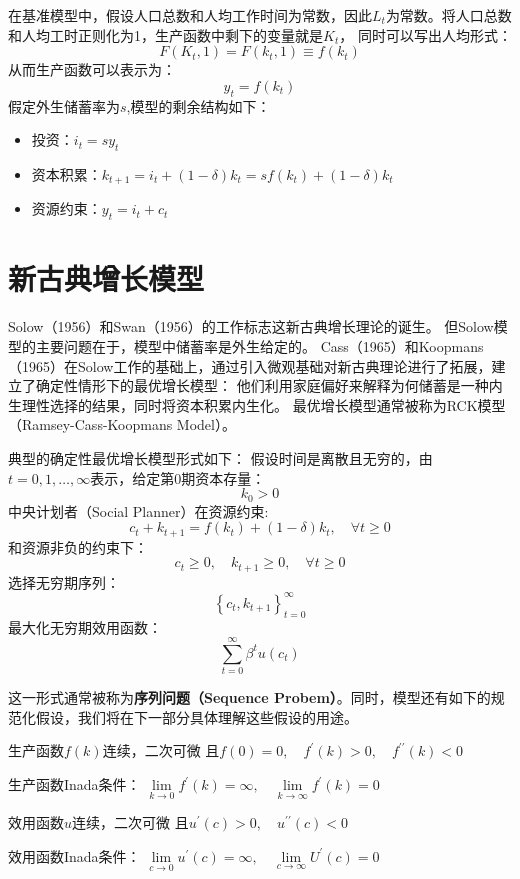 在基准模型中，假设人口总数和人均工作时间为常数，因此$L_t$为常数。将人口总数和人均工时正则化为1，生产函数中剩下的变量就是$K_t$，
同时可以写出人均形式：
\begin{equation*}
    F(K_t, 1)=F(k_t, 1)\equiv f(k_t)
\end{equation*}
从而生产函数可以表示为：
\begin{equation}
    y_t = f(k_t)
\end{equation}
假定外生储蓄率为$s$,模型的剩余结构如下：
\begin{itemize}
    \item 投资：$i_t = sy_t$
    \item 资本积累：$k_{t+1}=i_t+(1-\delta)k_t = sf(k_t)+(1-\delta)k_t$
    \item 资源约束：$y_t = i_t + c_t$
\end{itemize}


\section{新古典增长模型} \label{sec-ngm}

Solow（1956）和Swan（1956）的工作标志这新古典增长理论的诞生。
但Solow模型的主要问题在于，模型中储蓄率是外生给定的。
Cass（1965）和Koopmans（1965）在Solow工作的基础上，通过引入微观基础对新古典理论进行了拓展，建立了确定性情形下的最优增长模型：
他们利用家庭偏好来解释为何储蓄是一种内生理性选择的结果，同时将资本积累内生化。
最优增长模型通常被称为RCK模型（Ramsey-Cass-Koopmans Model）。

典型的确定性最优增长模型形式如下：
假设时间是离散且无穷的，由$t=0,1,\dots, \infty$表示，给定第0期资本存量：
$$k_0>0$$
中央计划者（Social Planner）在资源约束:
$$c_t+k_{t+1}=f\left(k_t\right)+(1-\delta)k_t,\quad \forall t \geq 0$$
和资源非负的约束下：
$$c_t \geq 0, \quad k_{t+1} \geq 0, \quad \forall t \geq 0$$
选择无穷期序列：
$$\left\{c_t, k_{t+1}\right\}_{t=0}^{\infty}$$
最大化无穷期效用函数：
$$\sum_{t=0}^{\infty} \beta^t u\left(c_t\right)$$

这一形式通常被称为\textbf{序列问题（Sequence Probem）}。同时，模型还有如下的规范化假设，我们将在下一部分具体理解这些假设的用途。
\begin{assumption} \label{as-f}
    生产函数$f\left(k\right)$连续，二次可微
        且$f\left(0\right)=0,\quad f^{\prime}\left(k\right)>0,\quad f^{\prime\prime}\left(k\right)<0$
\end{assumption}
\begin{assumption} \label{as-f-inada}
    生产函数Inada条件：
        $\lim\limits_{k \rightarrow 0} f^{\prime}(k)=\infty, \quad \lim\limits_{k \rightarrow \infty} f^{\prime}(k)=0$
\end{assumption}
\begin{assumption} \label{as-u}
    效用函数$u$连续，二次可微
        且$u^{\prime}\left(c\right)>0,\quad u^{\prime\prime}\left(c\right)<0$
\end{assumption}
\begin{assumption} \label{as-u-inada}
    效用函数Inada条件：
    $\lim\limits_{c \rightarrow 0} u^{\prime}(c)=\infty, \quad \lim\limits_{c \rightarrow \infty} U^{\prime}(c)=0$
\end{assumption}


